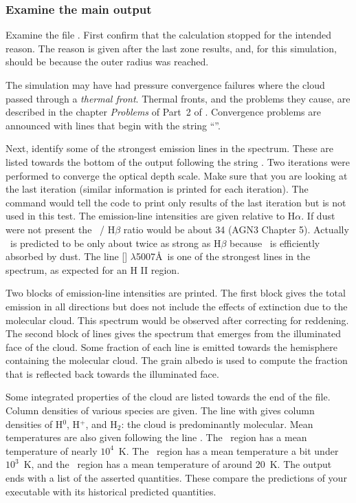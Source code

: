 \documentclass[12pt,twoside]{article}
\begin{document}
{\subsubsection{Examine the main output}

Examine the file .  First confirm that the
calculation stopped for the intended reason.  The reason is given after
the last zone results, and, for this simulation, should be because the outer
radius was reached.

The simulation may have had pressure convergence failures where the cloud
passed through a \emph{thermal front}.
Thermal fronts, and the problems they cause,
are described in the chapter \emph{Problems} of Part~2 of \Hazy.
Convergence problems are announced with lines that begin
with the string ``''.

Next, identify some of the strongest emission lines in the spectrum.
These are listed towards the bottom of the output following the string
.
Two iterations were performed to converge the
optical depth scale.
Make sure that you are looking at the last iteration
(similar information is printed for each iteration).
The command  would tell the code to print
only results of the last iteration but is not used in this test.
The emission-line intensities are given relative
to $\mathrm{H}\alpha$.
If dust were not present the \la\ / H$\beta$ ratio would be
about 34 (AGN3 Chapter 5).
Actually \la\ is predicted to be only about twice as strong
as H$\beta$ because \la\ is efficiently absorbed by dust.
The line [\oiii] $\lambda$5007\AA\ is one of the strongest lines
in the spectrum, as expected for an H II region.

Two blocks of emission-line intensities are printed.  The first block
 gives
the total emission in all directions
but does not include the effects of extinction due to the molecular cloud.
This spectrum would be observed after correcting for reddening. The second
block of lines  gives the spectrum that emerges
from the illuminated face of the cloud.  Some fraction of each line is
emitted towards the hemisphere containing the molecular cloud.  The grain
albedo is used to compute the fraction that is reflected back towards the
illuminated face.

Some integrated properties of the cloud are listed towards the end of
the file.
Column densities of various species are given.
The line with 
gives column densities of H$^0$, H$^+$,
and H$_2$: the cloud is predominantly molecular.
Mean temperatures are also
given following the line .
The \hplus\ region has a mean temperature of nearly $10^4$~K.
The \hO\ region has a mean temperature a bit under $10^3$~K,
and the \htwo\ region has a mean temperature
of around 20~K.
The output ends with a list of the asserted quantities.
These compare the predictions of your executable with its historical
predicted quantities.

}
\end{document}

